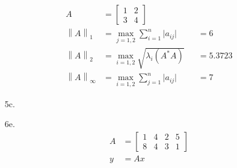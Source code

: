 \documentclass[12pt,fleqn,leqno,letterpaper]{article}
\newcommand{\norm}[1]{\left\lVert#1\right\rVert}
\begin{document}
\begin{enumerate}
\begin{align*}
                A &= \begin{bmatrix} 1 & 2 \\ 3 & 4 \end{bmatrix}\\
                    \norm{A}_{1} &= \max_{j = 1, 2} \sum_{i = 1}^{n} \lvert a_{ij} \rvert &&= 6\\
                    \norm{A}_{2} &= \max_{i = 1, 2} \sqrt{\lambda_{i} (A^{*}A)} &&=5.3723 \\
                    \norm{A}_{\infty} &= \max_{i = 1, 2} \sum_{j = 1}^{n} \lvert a_{ij} \rvert &&= 7
             \end{align*}
        \item[5c.]
            \begin{minipage}[t]{\linewidth}
                \raggedright
                \medskip
            \end{minipage}
        \item[6e.]
            \begin{align*}
                A &= \begin{bmatrix}1 & 4 & 2 & 5 \\ 8 & 4 & 3 & 1\end{bmatrix}\\
                y &= Ax\\

\end{align*}
\end{enumerate}
\end{document}
